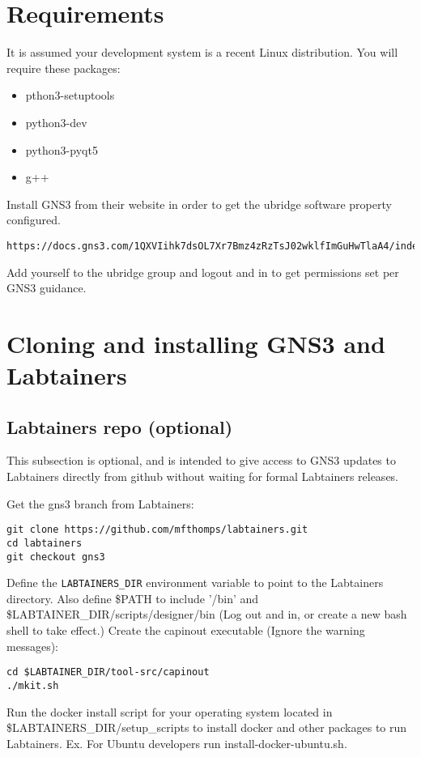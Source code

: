 \documentclass[12pt]{article}
\begin{document}
\section {Requirements}
It is assumed your development system is a recent Linux distribution.  You will require these packages:
\begin{itemize}
	\item pthon3-setuptools
	\item python3-dev
	\item python3-pyqt5
	\item g++
\end{itemize}
\noindent Install GNS3 from their website in order to get the ubridge software property configured.
\begin{verbatim}
https://docs.gns3.com/1QXVIihk7dsOL7Xr7Bmz4zRzTsJ02wklfImGuHwTlaA4/index.html
\end{verbatim}
Add yourself to the ubridge group and logout and in to get permissions set per GNS3 guidance.

\section{Cloning and installing GNS3 and Labtainers}
\subsection{Labtainers repo (optional)}
This subsection is optional, and is intended to give access to GNS3 updates to Labtainers directly
from github without waiting for formal Labtainers releases.  

Get the gns3 branch from Labtainers:
\begin{verbatim}
git clone https://github.com/mfthomps/labtainers.git
cd labtainers
git checkout gns3 
\end{verbatim}
\noindent Define the {\tt LABTAINERS\_DIR} environment variable to point to the Labtainers directory. Also define \$PATH to include '/bin' and \$LABTAINER\_DIR/scripts/designer/bin
(Log out and in, or create a new bash shell to take effect.)
Create the capinout executable (Ignore the warning messages):
\begin{verbatim}
cd $LABTAINER_DIR/tool-src/capinout
./mkit.sh
\end{verbatim}
\noindent Run the docker install script for your operating system located in \$LABTAINERS\_DIR/setup\_scripts to install docker and other packages to run Labtainers. Ex. For Ubuntu developers run install-docker-ubuntu.sh.
\end{document}
